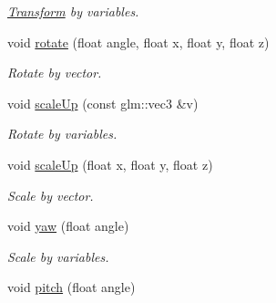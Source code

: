 \begin{DoxyCompactItemize}
\begin{DoxyCompactList}\small\item\em \hyperlink{class_transform}{Transform} by variables. \end{DoxyCompactList}\item 
\hypertarget{class_transform_component_a7c97e7f1e9924b811319acb73accde72}{void \hyperlink{class_transform_component_a7c97e7f1e9924b811319acb73accde72}{rotate} (float angle, float x, float y, float z)}\label{class_transform_component_a7c97e7f1e9924b811319acb73accde72}

\begin{DoxyCompactList}\small\item\em Rotate by vector. \end{DoxyCompactList}\item 
\hypertarget{class_transform_component_a45483b2f5f38819ad0db6fcfe0f0ded8}{void \hyperlink{class_transform_component_a45483b2f5f38819ad0db6fcfe0f0ded8}{scale\+Up} (const glm\+::vec3 \&v)}\label{class_transform_component_a45483b2f5f38819ad0db6fcfe0f0ded8}

\begin{DoxyCompactList}\small\item\em Rotate by variables. \end{DoxyCompactList}\item 
\hypertarget{class_transform_component_a161374892f674b2e6d34bcaeb66a2a28}{void \hyperlink{class_transform_component_a161374892f674b2e6d34bcaeb66a2a28}{scale\+Up} (float x, float y, float z)}\label{class_transform_component_a161374892f674b2e6d34bcaeb66a2a28}

\begin{DoxyCompactList}\small\item\em Scale by vector. \end{DoxyCompactList}\item 
\hypertarget{class_transform_component_ae32c6f3f18b81fc712629fb689d61252}{void \hyperlink{class_transform_component_ae32c6f3f18b81fc712629fb689d61252}{yaw} (float angle)}\label{class_transform_component_ae32c6f3f18b81fc712629fb689d61252}

\begin{DoxyCompactList}\small\item\em Scale by variables. \end{DoxyCompactList}\item 
\hypertarget{class_transform_component_ad363ec339461bde470fcc50103d12ba7}{void \hyperlink{class_transform_component_ad363ec339461bde470fcc50103d12ba7}{pitch} (float angle)}\label{class_transform_component_ad363ec339461bde470fcc50103d12ba7}


\end{DoxyCompactItemize}
